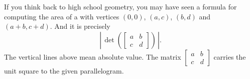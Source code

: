 \documentclass{ximera}
\begin{document}
If you think back to high school geometry, you may have seen a formula for computing the area of a  with vertices $(0,0)$, $(a,c)$, $(b,d)$ and $(a+b,c+d)$.  And it is precisely
\begin{equation*}
    \left\lvert \, \det \left(
    \begin{bmatrix} 
        a & b \\ 
        c & d 
    \end{bmatrix}
    \right) \, \right\lvert.
\end{equation*}
The vertical lines above mean absolute value. The matrix $\left[ \begin{smallmatrix} a & b \\ c & d \end{smallmatrix} \right]$ carries the unit square to the given parallelogram.
\end{document}
